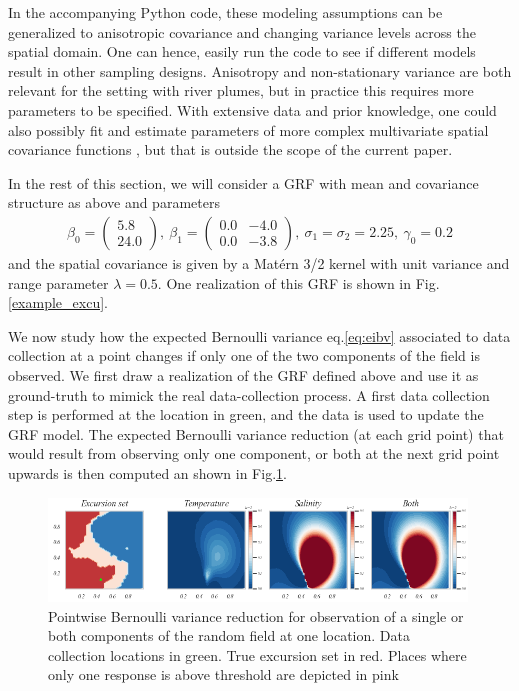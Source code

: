 In the accompanying Python code, these modeling assumptions can be
generalized to anisotropic covariance and changing variance levels
across the spatial domain. One can hence, easily run the code to see
if different models result in other sampling designs. Anisotropy and
non-stationary variance are both relevant for the setting with river
plumes, but in practice this requires more parameters to be
specified. With extensive data and prior knowledge, one could also
possibly fit and estimate parameters of more complex multivariate
spatial covariance functions
\citep{gneiting2010matern,genton2015cross}, but that is outside the
scope of the current paper.

In the rest of this section, we will consider a GRF with mean and covariance structure as above and parameters
\begin{align*}
\beta_0 = \begin{pmatrix}
5.8\\ 24.0
\end{pmatrix}, ~ \beta_1 = \begin{pmatrix}
0.0 & -4.0\\
0.0 & -3.8
\end{pmatrix},~ \sigma_1 = \sigma_2 = 2.25, ~ \gamma_0 = 0.2
\end{align*}
and the spatial covariance is given by a Mat\'{e}rn 3/2 kernel with unit variance and range parameter $\lambda=0.5$.
One realization of this GRF is shown in Fig. \ref{example_excu}.

We now study how the expected Bernoulli variance eq.\ref{eq:eibv} associated to data collection at a point changes if only one of the two components of the field is observed. We first draw a realization of the GRF defined above and use it as ground-truth to mimick the real data-collection process. A first data collection step is performed at the location in green, and the data is used to update the GRF model. The expected Bernoulli variance reduction (at each grid point) that would result from observing only one component, or both at the next grid point upwards is then computed an shown in Fig.\ref{fig:ebv_comp}.

\begin{figure}[h!] \centering
  \includegraphics[width=0.99\textwidth]{Figures/ebv_comp.png}
  \caption{Pointwise Bernoulli variance reduction for observation of a single or both components of the random field at one location. Data collection locations in green. True excursion set in red. Places where only one response is above threshold are depicted in pink}
\label{fig:ebv_comp}
\end{figure}

